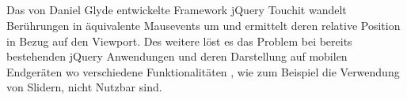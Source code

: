 	\subsection{}
	Das von Daniel Glyde entwickelte Framework jQuery Touchit wandelt Berührungen in äquivalente Mausevents um und ermittelt 	deren relative Position in Bezug auf den Viewport. Des weitere löst es das Problem bei bereits bestehenden jQuery 				Anwendungen und deren Darstellung auf mobilen Endgeräten wo verschiedene Funktionalitäten , wie zum Beispiel die 			Verwendung von Slidern, nicht Nutzbar sind.
	
	
	
	